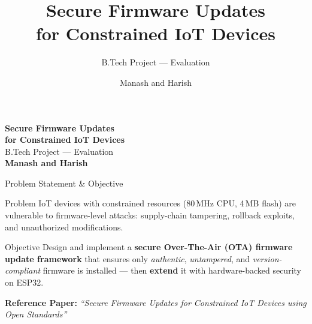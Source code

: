 \documentclass[aspectratio=169]{beamer}
\date{}
\title{\textbf{Secure Firmware Updates\\for Constrained IoT Devices}}
\subtitle{B.Tech Project --- Evaluation}
\author{
  Manash \quad and \quad Harish
}
\begin{document}
{
\begin{frame}[plain]
  \vfill
  \centering
  {\Huge\textbf{\color{black}Secure Firmware Updates}\\[4pt]
   \Huge\textbf{\color{black}for Constrained IoT Devices}}\\[16pt]
  {\large\color{black!75}B.Tech Project --- Evaluation}\\[24pt]
  {\normalsize\color{black!85}\textbf{Manash \quad and \quad Harish}}\\[8pt]
  \vfill
\end{frame}
}

\begin{frame}{Problem Statement \& Objective}

\begin{block}{Problem}
IoT devices with constrained resources (80\,MHz CPU, 4\,MB flash) are vulnerable to firmware-level attacks: supply-chain tampering, rollback exploits, and unauthorized modifications.
\end{block}

\vspace{6pt}
\begin{block}{Objective}
Design and implement a \textbf{secure Over-The-Air (OTA) firmware update framework} that ensures only \emph{authentic}, \emph{untampered}, and \emph{version-compliant} firmware is installed --- then \textbf{extend} it with hardware-backed security on ESP32.
\end{block}

\vspace{6pt}
\textbf{Reference Paper:} \textit{``Secure Firmware Updates for Constrained IoT Devices using Open Standards''}

\end{frame}
\end{document}

